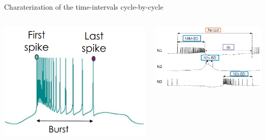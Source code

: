\documentclass[aspectratio=43]{beamer}
\begin{document}
\begin{frame}{Charaterization of the time-intervals cycle-by-cycle}
	\begin{columns}
		\begin{column}{0.4\textwidth}
			\includegraphics[width=\textwidth]{Images/time-references.png}
		\end{column}
		\begin{column}{0.6\textwidth}
			\includegraphics[width=\textwidth]{methods-paper-modelo/figure4a.eps}
		\end{column}
	\end{columns}
\end{frame}
\end{document}
